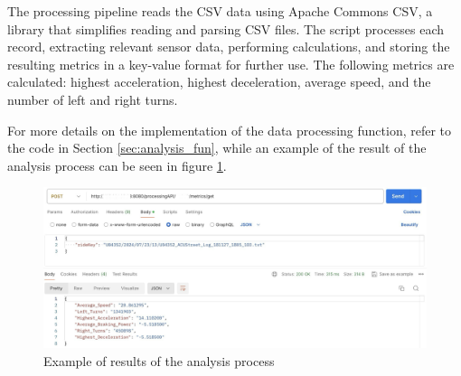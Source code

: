 The processing pipeline reads the CSV data using Apache Commons CSV, a library that simplifies reading and parsing CSV files. The script processes each record, extracting relevant sensor data, performing calculations, and storing the resulting metrics in a key-value format for further use. The following metrics are calculated: highest acceleration, highest deceleration, average speed, and the number of left and right turns.

For more details on the implementation of the data processing function, refer to the code in Section \ref{sec:analysis_fun}, while an example of the result of the analysis process can be seen in figure \ref{fig:analysis}.
\begin{figure}[htbp]
    \centering
    \includegraphics[width=1\textwidth]{Immagini/get_metrics.png}
    \caption{Example of results of the analysis process}
    \label{fig:analysis}
\end{figure}